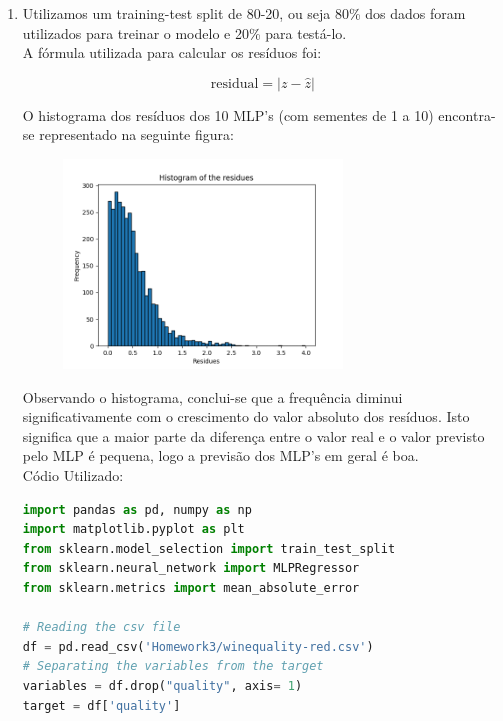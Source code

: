 \documentclass[a4paper,12pt]{article} %
\begin{document}
\begin{enumerate}

\item Utilizamos um training-test split de 80-20, ou seja 80\% dos dados foram utilizados para treinar o modelo e 20\% para testá-lo.\\ 
A fórmula utilizada para calcular os resíduos foi:

\begin{equation}
    \text{residual} = | z - \hat{z} |
\end{equation}

O histograma dos resíduos dos 10 MLP's (com sementes de 1 a 10) encontra-se representado na seguinte figura:

\begin{figure}[H]
    \centering
    \includegraphics[width=0.7\textwidth]{ex1_histogram.png}
\end{figure}

Observando o histograma, conclui-se que a frequência diminui significativamente 
com o crescimento do valor absoluto dos resíduos. Isto significa que a maior parte
da diferença entre o valor real e o valor previsto pelo MLP é pequena, logo a previsão
dos MLP's em geral é boa.\\

Códio Utilizado:

\begin{lstlisting}[language=Python]
import pandas as pd, numpy as np
import matplotlib.pyplot as plt
from sklearn.model_selection import train_test_split
from sklearn.neural_network import MLPRegressor
from sklearn.metrics import mean_absolute_error

# Reading the csv file
df = pd.read_csv('Homework3/winequality-red.csv')
# Separating the variables from the target
variables = df.drop("quality", axis= 1)
target = df['quality']


\end{lstlisting}
\end{enumerate}
\end{document}
